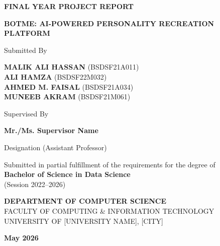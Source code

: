 \documentclass[12pt,a4paper]{report}
\begin{document}

\begin{titlepage}
    \centering
    \vspace*{1cm}
    
    {\Large \textbf{FINAL YEAR PROJECT REPORT}\par}
    \vspace{1.5cm}
    
    {\Huge \textbf{BOTME: AI-POWERED PERSONALITY RECREATION PLATFORM}\par}
    \vspace{1.5cm}
    
    {\large Submitted By\par}
    \vspace{0.8cm}
    
    {\large
    \textbf{MALIK ALI HASSAN} (BSDSF21A011) \\
    \textbf{ALI HAMZA} (BSDSF22M032) \\
    \textbf{AHMED M. FAISAL} (BSDSF21A034) \\
    \textbf{MUNEEB AKRAM} (BSDSF21M061)
    \par}
    
    \vspace{1.5cm}
    
    {\large Supervised By\par}
    {\large \textbf{Mr./Ms. Supervisor Name}\par}
    {\large Designation (Assistant Professor)\par}
    
    \vfill
    
    {\large
    Submitted in partial fulfillment of the requirements for the degree of \\
    \textbf{Bachelor of Science in Data Science} \\
    (Session 2022--2026)
    \par}
    
    \vspace{1cm}
    
    {\large
    \textbf{DEPARTMENT OF COMPUTER SCIENCE} \\
    FACULTY OF COMPUTING \& INFORMATION TECHNOLOGY \\
    UNIVERSITY OF [UNIVERSITY NAME], [CITY]
    \par}
    
    \vspace{0.5cm}
    {\large \textbf{May 2026}}
    
\end{titlepage}
\end{document}
